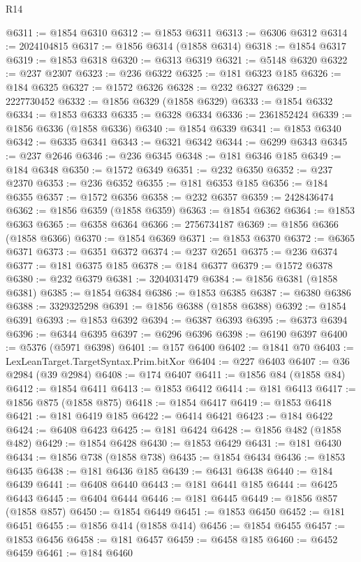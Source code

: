 \begin{lexlean}{R14}
\begin{coremodule}
@6311 := @1854 @6310
@6312 := @1853 @6311
@6313 := @6306 @6312
@6314 := 2024104815
@6317 := @1856 @6314 (@1858 @6314)
@6318 := @1854 @6317
@6319 := @1853 @6318
@6320 := @6313 @6319
@6321 := @5148 @6320
@6322 := @237 @2307
@6323 := @236 @6322
@6325 := @181 @6323 @185
@6326 := @184 @6325
@6327 := @1572 @6326
@6328 := @232 @6327
@6329 := 2227730452
@6332 := @1856 @6329 (@1858 @6329)
@6333 := @1854 @6332
@6334 := @1853 @6333
@6335 := @6328 @6334
@6336 := 2361852424
@6339 := @1856 @6336 (@1858 @6336)
@6340 := @1854 @6339
@6341 := @1853 @6340
@6342 := @6335 @6341
@6343 := @6321 @6342
@6344 := @6299 @6343
@6345 := @237 @2646
@6346 := @236 @6345
@6348 := @181 @6346 @185
@6349 := @184 @6348
@6350 := @1572 @6349
@6351 := @232 @6350
@6352 := @237 @2370
@6353 := @236 @6352
@6355 := @181 @6353 @185
@6356 := @184 @6355
@6357 := @1572 @6356
@6358 := @232 @6357
@6359 := 2428436474
@6362 := @1856 @6359 (@1858 @6359)
@6363 := @1854 @6362
@6364 := @1853 @6363
@6365 := @6358 @6364
@6366 := 2756734187
@6369 := @1856 @6366 (@1858 @6366)
@6370 := @1854 @6369
@6371 := @1853 @6370
@6372 := @6365 @6371
@6373 := @6351 @6372
@6374 := @237 @2651
@6375 := @236 @6374
@6377 := @181 @6375 @185
@6378 := @184 @6377
@6379 := @1572 @6378
@6380 := @232 @6379
@6381 := 3204031479
@6384 := @1856 @6381 (@1858 @6381)
@6385 := @1854 @6384
@6386 := @1853 @6385
@6387 := @6380 @6386
@6388 := 3329325298
@6391 := @1856 @6388 (@1858 @6388)
@6392 := @1854 @6391
@6393 := @1853 @6392
@6394 := @6387 @6393
@6395 := @6373 @6394
@6396 := @6344 @6395
@6397 := @6296 @6396
@6398 := @6190 @6397
@6400 := @5376 (@5971 @6398)
@6401 := @157 @6400
@6402 := @1841 @70
@6403 := LexLeanTarget.TargetSyntax.Prim.bitXor
@6404 := @227 @6403
@6407 := @36 @2984 (@39 @2984)
@6408 := @174 @6407
@6411 := @1856 @84 (@1858 @84)
@6412 := @1854 @6411
@6413 := @1853 @6412
@6414 := @181 @6413
@6417 := @1856 @875 (@1858 @875)
@6418 := @1854 @6417
@6419 := @1853 @6418
@6421 := @181 @6419 @185
@6422 := @6414 @6421
@6423 := @184 @6422
@6424 := @6408 @6423
@6425 := @181 @6424
@6428 := @1856 @482 (@1858 @482)
@6429 := @1854 @6428
@6430 := @1853 @6429
@6431 := @181 @6430
@6434 := @1856 @738 (@1858 @738)
@6435 := @1854 @6434
@6436 := @1853 @6435
@6438 := @181 @6436 @185
@6439 := @6431 @6438
@6440 := @184 @6439
@6441 := @6408 @6440
@6443 := @181 @6441 @185
@6444 := @6425 @6443
@6445 := @6404 @6444
@6446 := @181 @6445
@6449 := @1856 @857 (@1858 @857)
@6450 := @1854 @6449
@6451 := @1853 @6450
@6452 := @181 @6451
@6455 := @1856 @414 (@1858 @414)
@6456 := @1854 @6455
@6457 := @1853 @6456
@6458 := @181 @6457
@6459 := @6458 @185
@6460 := @6452 @6459
@6461 := @184 @6460

\end{coremodule}
\end{lexlean}
